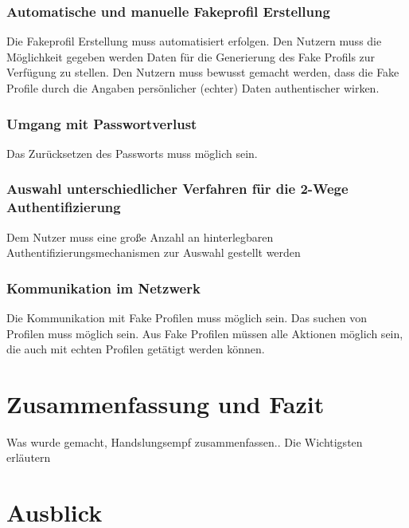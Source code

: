 \documentclass{sigchi}
\begin{document}
\subsubsection{Automatische und manuelle Fakeprofil Erstellung}
Die Fakeprofil Erstellung muss automatisiert erfolgen. Den Nutzern muss die Möglichkeit gegeben werden Daten für die Generierung des Fake Profils zur Verfügung zu stellen. Den Nutzern muss bewusst gemacht werden, dass die Fake Profile durch die Angaben persönlicher (echter) Daten authentischer wirken.
\subsubsection{Umgang mit Passwortverlust}
Das Zurücksetzen des Passworts muss möglich sein.
\subsubsection{Auswahl unterschiedlicher Verfahren für die 2-Wege Authentifizierung}
Dem Nutzer muss eine große Anzahl an hinterlegbaren Authentifizierungsmechanismen zur Auswahl gestellt werden
\subsubsection{Kommunikation im Netzwerk}
Die Kommunikation mit Fake Profilen muss möglich sein. Das suchen von Profilen muss möglich sein. Aus Fake Profilen müssen alle Aktionen möglich sein, die auch mit echten Profilen getätigt werden können.
\section{Zusammenfassung und Fazit}
Was wurde gemacht, Handslungsempf zusammenfassen..
Die Wichtigsten erläutern
\section{Ausblick}

%
%
\end{document}
